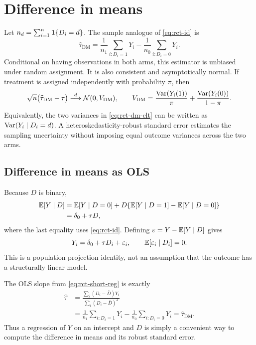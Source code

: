 \section{Difference in means}
\label{sec:rct-dm}

Let $n_d=\sum_{i=1}^n\mathbf{1}\{D_i=d\}$.  The sample analogue of
\eqref{eq:rct-id} is
\begin{equation}
  \widehat\tau_{\mathrm{DM}}
  =\frac{1}{n_1}\sum_{i:D_i=1}Y_i
   -\frac{1}{n_0}\sum_{i:D_i=0}Y_i.
  \label{eq:rct-dm}
\end{equation}
Conditional on having observations in both arms, this estimator is unbiased under
random assignment.  It is also consistent and asymptotically normal.  If treatment
is assigned independently with probability $\pi$, then
\begin{equation}
  \sqrt n\bigl(\widehat\tau_{\mathrm{DM}}-\tau\bigr)
  \overset{d}{\longrightarrow} \mathcal{N}(0,V_{\mathrm{DM}}),
  \qquad
  V_{\mathrm{DM}}
  =\frac{\operatorname{Var}(Y_i(1))}{\pi}
   +\frac{\operatorname{Var}(Y_i(0))}{1-\pi}.
  \label{eq:rct-dm-clt}
\end{equation}
Equivalently, the two variances in \eqref{eq:rct-dm-clt} can be written as
$\operatorname{Var}(Y_i\mid D_i=d)$.  A heteroskedasticity-robust standard error estimates the
sampling uncertainty without imposing equal outcome variances across the two arms.

\subsection{Difference in means as OLS}

Because $D$ is binary,
\begin{align*}
  \mathbb{E}[Y\mid D]
  &=\mathbb{E}[Y\mid D=0]
    +D\{\mathbb{E}[Y\mid D=1]-\mathbb{E}[Y\mid D=0]\}\\
  &=\delta_0+\tau D,
\end{align*}
where the last equality uses \eqref{eq:rct-id}.  Defining
$\varepsilon=Y-\mathbb{E}[Y\mid D]$ gives
\begin{equation}
  Y_i=\delta_0+\tau D_i+\varepsilon_i,
  \qquad \mathbb{E}[\varepsilon_i\mid D_i]=0.
  \label{eq:rct-short-reg}
\end{equation}
This is a population projection identity, not an assumption that the outcome has a
structurally linear model.

The OLS slope from \eqref{eq:rct-short-reg} is exactly
\begin{align*}
  \widehat\tau
  &=\frac{\sum_i(D_i-\bar D)Y_i}
          {\sum_i(D_i-\bar D)^2}\\
  &=\frac{1}{n_1}\sum_{i:D_i=1}Y_i
    -\frac{1}{n_0}\sum_{i:D_i=0}Y_i
   =\widehat\tau_{\mathrm{DM}}.
\end{align*}
Thus a regression of $Y$ on an intercept and $D$ is simply a convenient way to
compute the difference in means and its robust standard error.

